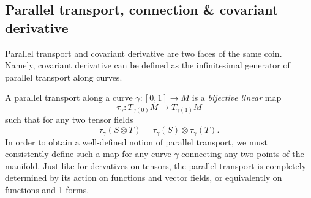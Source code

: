 \subsection{Parallel transport, connection \& covariant derivative}


Parallel transport and covariant derivative are two faces of the same coin.
Namely, covariant derivative can be defined as the infinitesimal generator of parallel transport along curves.

\begin{mytheorem}
A parallel transport along a curve $\gamma: [0,1] \to M$ is a \emph{bijective linear} map 
\begin{equation}
    \tau_{\gamma}: T_{\gamma(0)} M \to T_{\gamma(1)} M
\end{equation}
such that for any two tensor fields
\begin{equation}\label{}
    \tau_{\gamma} (S \otimes T) = \tau_{\gamma} (S) \otimes \tau_{\gamma} (T).
\end{equation}
In order to obtain a well-defined notion of parallel transport, we must consistently define such a map for any curve $\gamma$ connecting any two points of the manifold.
Just like for dervatives on tensors, the parallel transport is completely determined by its action on functions and vector fields, or equivalently on functions and 1-forms.
\end{mytheorem}


